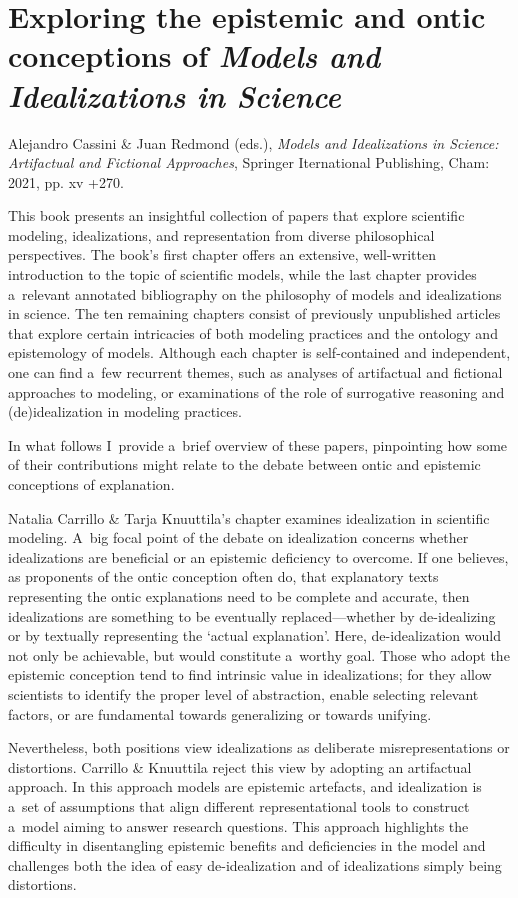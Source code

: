 

\section{Exploring the epistemic and ontic conceptions of \textit{Models and Idealizations in Science}}
Alejandro Cassini \& Juan Redmond (eds.), \textit{Models and Idealizations in Science: Artifactual and Fictional Approaches}, Springer Iternational Publishing, Cham: 2021, pp. xv +270.

This book presents an insightful collection of papers that explore scientific modeling, idealizations, and representation from diverse philosophical perspectives. The book's first chapter offers an extensive, well-written introduction to the topic of scientific models, while the last chapter provides a~relevant annotated bibliography on the philosophy of models and idealizations in science. The ten remaining chapters consist of previously unpublished articles that explore certain intricacies of both modeling practices and the ontology and epistemology of models. Although each chapter is self-contained and independent, one can find a~few recurrent themes, such as analyses of artifactual and fictional approaches to modeling, or examinations of the role of surrogative reasoning and (de)idealization in modeling practices.

In what follows I~provide a~brief overview of these papers, pinpointing how some of their contributions might relate to the debate between ontic and epistemic conceptions of explanation.

Natalia Carrillo \& Tarja Knuuttila's chapter examines idealization in scientific modeling. A~big focal point of the debate on idealization concerns whether idealizations are beneficial or an epistemic deficiency to overcome. If one believes, as proponents of the ontic conception often do, that explanatory texts representing the ontic explanations need to be complete and accurate, then idealizations are something to be eventually replaced---whether by de-idealizing or by textually representing the ‘actual explanation'. Here, de-idealization would not only be achievable, but would constitute a~worthy goal. Those who adopt the epistemic conception tend to find intrinsic value in idealizations; for they allow scientists to identify the proper level of abstraction, enable selecting relevant factors, or are fundamental towards generalizing or towards unifying.

Nevertheless, both positions view idealizations as deliberate misrepresentations or distortions. Carrillo \& Knuuttila reject this view by adopting an artifactual approach. In this approach models are epistemic artefacts, and idealization is a~set of assumptions that align different representational tools to construct a~model aiming to answer research questions. This approach highlights the difficulty in disentangling epistemic benefits and deficiencies in the model and challenges both the idea of easy de-idealization and of idealizations simply being distortions.

